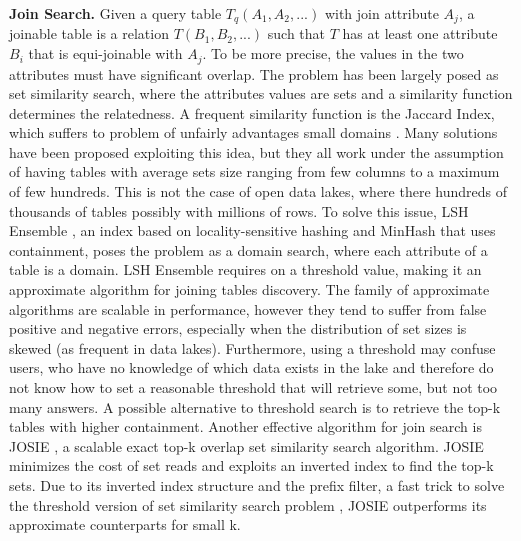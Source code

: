 \textbf{Join Search.} Given a query table $T_q(A_1,A_2,...)$ with join attribute $A_j$, a joinable table is a relation $T(B_1, B_2,...)$ such that $T$ has at least one attribute $B_i$ that is equi-joinable with $A_j$. To be more precise, the values in the two attributes must have significant overlap. The problem has been largely posed as set similarity search, where the attributes values are sets and a similarity function determines the relatedness. A frequent similarity function is the Jaccard Index, which suffers to problem of unfairly advantages small domains \cite{zhu2016lsh}. Many solutions have been proposed exploiting this idea, but they all work under the assumption of having tables with average sets size ranging from few columns to a maximum of few hundreds. This is not the case of open data lakes, where there hundreds of thousands of tables possibly with millions of rows. To solve this issue,  LSH Ensemble \cite{zhu2016lsh}, an index based on locality-sensitive hashing \cite{gionis1999similarity} and MinHash \cite{indyk1998approximate} that uses containment, poses the problem as a domain search, where each attribute of a table is a domain. LSH Ensemble requires on a threshold value, making it an approximate algorithm for joining tables discovery. The family of approximate algorithms are scalable in performance, however they tend to suffer from false positive and negative errors, especially when the distribution of set sizes is skewed (as frequent in data lakes). Furthermore, using a threshold may confuse users, who have no knowledge of which data exists in the lake and therefore do not know how to set a reasonable threshold that will retrieve some, but not too many answers. A possible alternative to threshold search is to retrieve the top-k tables with higher containment. Another effective algorithm for join search is JOSIE \cite{zhu2019josie}, a scalable exact top-k overlap set similarity search algorithm. JOSIE minimizes the cost of set reads and exploits an inverted index to find the top-k sets. Due to its inverted index structure and the prefix filter, a fast trick to solve the threshold version of set similarity search problem \cite{chaudhuri2006primitive}, JOSIE outperforms its approximate counterparts for small k.
\bigbreak

